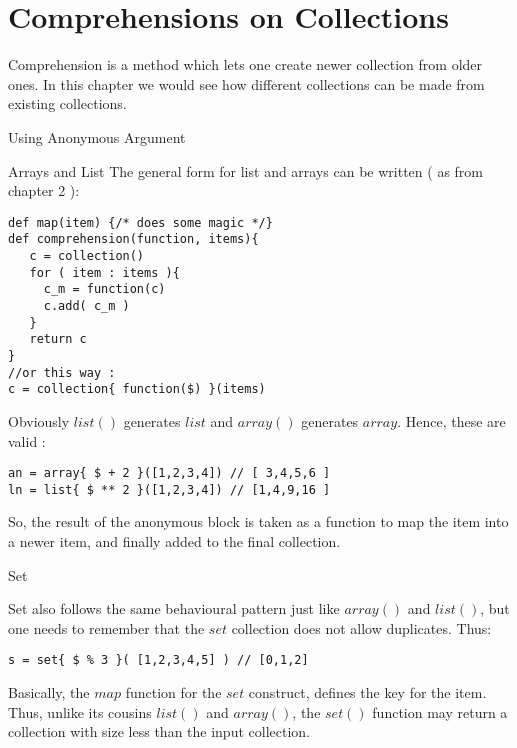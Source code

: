 \chapter{Comprehensions on Collections}\label{comprehension-collection}

{\LARGE C}omprehension is a method which lets one create newer collection from older ones.
In this chapter we would see how different collections can be made from existing collections.

\begin{section}{Using Anonymous Argument}

\begin{subsection}{Arrays and List}
The general form for list and arrays can be written ( as from chapter 2 ):
\begin{lstlisting}[style=JexlStyle]
def map(item) {/* does some magic */}
def comprehension(function, items){
   c = collection()
   for ( item : items ){
     c_m = function(c)
     c.add( c_m ) 
   }
   return c
}
//or this way :
c = collection{ function($) }(items)
\end{lstlisting}
Obviously $list()$ generates $list$ and $array()$ generates $array$.
Hence, these are valid :
\begin{lstlisting}[style=JexlStyle]
an = array{ $ + 2 }([1,2,3,4]) // [ 3,4,5,6 ]
ln = list{ $ ** 2 }([1,2,3,4]) // [1,4,9,16 ]
\end{lstlisting}

So, the result of the anonymous block is taken as a function to map the item into a newer item, 
and finally added to the final collection.

\end{subsection}

\begin{subsection}{Set}

Set also follows the same behavioural pattern just like $array()$ and $list()$, but one needs 
to remember that the $set$ collection does not allow duplicates. Thus:

\begin{lstlisting}[style=JexlStyle]
s = set{ $ % 3 }( [1,2,3,4,5] ) // [0,1,2]
\end{lstlisting}

Basically, the $map$ function for the $set$ construct, defines the key for the item.
Thus, unlike its cousins $list()$ and $array()$, the $set()$ function may return a collection
with size less than the input collection. 


\end{subsection}
\end{section}
